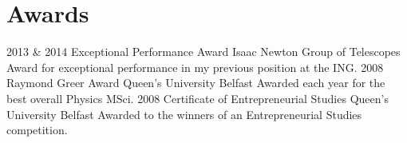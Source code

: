 \documentclass[print]{friggeri-cv} %
\begin{document}

\section{Awards}

\begin{entrylist}
\entry
{2013 \& 2014}
{Exceptional Performance Award}
{Isaac Newton Group of Telescopes}
{Award for exceptional performance in my previous position at the ING.}
\entry
{2008}
{Raymond Greer Award}
{Queen's University Belfast}
{Awarded each year for the best overall Physics MSci.}
\entry
{2008}
{Certificate of Entrepreneurial Studies}
{Queen's University Belfast}
{Awarded to the winners of an Entrepreneurial Studies competition.}

\end{entrylist}

\end{document}

